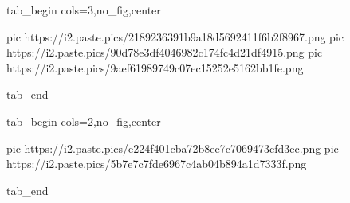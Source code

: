  
 
 
 
 


\ifcmt
  tab_begin cols=3,no_fig,center

     pic https://i2.paste.pics/2189236391b9a18d5692411f6b2f8967.png
		 pic https://i2.paste.pics/90d78e3df4046982c174fc4d21df4915.png
		 pic https://i2.paste.pics/9aef61989749c07ec15252e5162bb1fe.png

  tab_end

  tab_begin cols=2,no_fig,center

		 pic https://i2.paste.pics/e224f401cba72b8ee7c7069473cfd3ec.png
		 pic https://i2.paste.pics/5b7e7c7fde6967c4ab04b894a1d7333f.png

  tab_end
\fi
